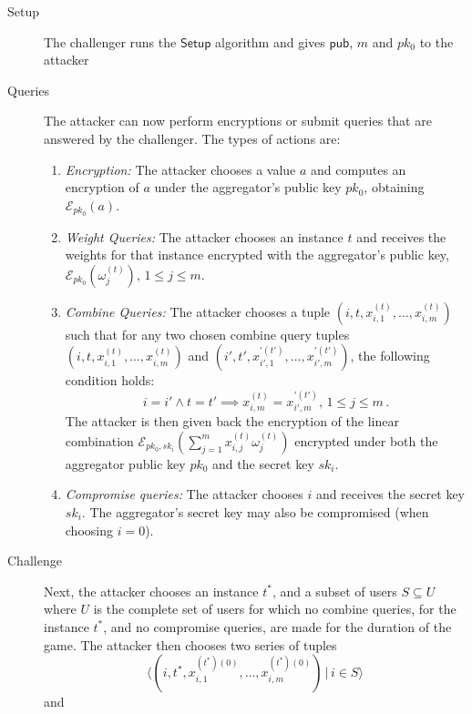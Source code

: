 \documentclass[twocolumn]{autart}
\begin{document}
\begin{description}
    \item[Setup] The challenger runs the $\mathsf{Setup}$ algorithm and gives $\mathsf{pub}$, $m$ and $pk_0$ to the attacker
    \item[Queries] The attacker can now perform encryptions or submit queries that are answered by the challenger. The types of actions are:
    \begin{enumerate}
        \item \textit{Encryption:} The attacker chooses a value $a$ and computes an encryption of $a$ under the aggregator's public key $pk_0$, obtaining $\mathcal{E}_{pk_0}(a)$.
        \item \textit{Weight Queries:} The attacker chooses an instance $t$ and receives the weights for that instance encrypted with the aggregator's public key, $\mathcal{E}_{pk_0}(\omega^{(t)}_{j}),\,1\leq j\leq m$.
        \item \textit{Combine Queries:} The attacker chooses a tuple $(i,t,x^{(t)}_{i,1},\dots,x^{(t)}_{i,m})$ such that for any two chosen combine query tuples $(i,t,x^{(t)}_{i,1},\dots,x^{(t)}_{i,m})$ and $(i',t',x^{\prime(t')}_{i',1},\dots,x^{\prime(t')}_{i',m})$, the following condition holds:
        \begin{equation*}
            i = i' \wedge t = t' \implies x^{(t)}_{i,m} = x^{\prime(t')}_{i',m},\,1\leq j\leq m\,.
        \end{equation*}
        The attacker is then given back the encryption of the linear combination $\mathcal{E}_{pk_0,sk_i}(\sum^m_{j=1}x^{(t)}_{i,j}\omega^{(t)}_j)$ encrypted under both the aggregator public key $pk_0$ and the secret key $sk_i$.
        \item \textit{Compromise queries:} The attacker chooses $i$ and receives the secret key $sk_i$. The aggregator's secret key may also be compromised (when choosing $i=0$).
    \end{enumerate} 
    \item[Challenge] Next, the attacker chooses an instance $t^*$, and a subset of users $S \subseteq U$ where $U$ is the complete set of users for which no combine queries, for the instance $t^*$, and no compromise queries, are made for the duration of the game. The attacker then chooses two series of tuples
    \begin{equation*}
        \langle(i,t^*,x^{(t^*)(0)}_{i,1},\dots,x^{(t^*)(0)}_{i,m})\,|\,i \in S\rangle
    \end{equation*}
    and
    \begin{equation*}

\end{equation*}
\end{description}
\end{document}
